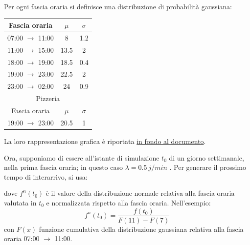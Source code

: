 \documentclass[a4paper, 12pt]{article}
\newcommand{\key}[1]{\texttt{\StrSubstitute{#1}{_}{\_}}}
\begin{document}
Per ogni fascia oraria si definisce una distribuzione di probabilità gaussiana:\\

\begin{table}[H]
\centering
\begin{tabular}{ |c|c|c| }
	\hline
    \cellcolor{cellcolor} Fascia oraria & \cellcolor{cellcolor}$\mu$ & \cellcolor{cellcolor}$\sigma$\\
	\hline
    \hline

  	07:00 $\rightarrow$ 11:00 & 8 & 1.2 \\
    \hline	
	
	11:00 $\rightarrow$ 15:00 & 13.5 & 2 \\
    \hline
  
	18:00 $\rightarrow$ 19:00 & 18.5 & 0.4 \\  
    \hline
    
	19:00 $\rightarrow$ 23:00 & 22.5 & 2\\
    \hline
    
    23:00 $\rightarrow$ 02:00 & 24 & 0.9 \\
    \hline    
    \hline
    
    \multicolumn{3}{|c|}{\cellcolor{cellcolor} Pizzeria}\\
    \hline
    \cellcolor{cellcolor} Fascia oraria & \cellcolor{cellcolor}$\mu$ & \cellcolor{cellcolor}$\sigma$\\
	\hline
    \hline
    19:00 $\rightarrow$ 23:00 & 20.5 & 1\\
    \hline
    
\end{tabular}
\end{table}

La loro rappresentazione grafica è riportata \hyperlink{rappresentazione grafica gaussiane}{in fondo al documento}. 
\bigskip

Ora, supponiamo di essere all'istante di simulazione $t_0$ di un giorno settimanale, nella prima fascia oraria; in questo caso $\lambda = 0.5\ j/min$ .  Per generare il prossimo tempo di interarrivo, si usa:
\begin{center}
\key{Exponential(1/$\lambda$) * $f^n(t0)$}
\end{center}
dove $f^n(t_0)$ è il valore della distribuzione normale relativa alla fascia oraria valutata in $t_0$ e normalizzata rispetto alla fascia oraria. Nell'esempio:
\[
f^n(t_0) = \frac{f(t_0)}{F(11) - F(7)}
\]
con $F(x)$ funzione cumulativa della distribuzione gaussiana relativa alla fascia oraria 07:00 $\rightarrow$ 11:00.\\
\end{document}
